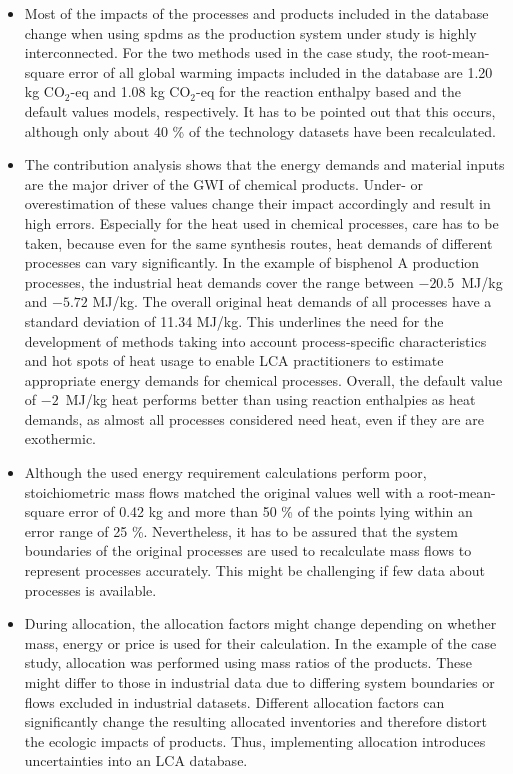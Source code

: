\begin{itemize}

    \item Most of the impacts of the processes and products included in the database change when using \aclp{spdm} as the production system under study is highly interconnected. For the two methods used in the case study, the root-mean-square error of all global warming impacts included in the database are 1.20 kg CO$_2$-eq and 1.08 kg CO$_2$-eq for the reaction enthalpy based and the default values models, respectively. It has to be pointed out that this occurs, although only about 40 \% of the technology datasets have been recalculated. 
    \item The contribution analysis shows that the energy demands and material inputs are the major driver of the \acl{GWI} of chemical products. Under- or overestimation of these values change their impact accordingly and result in high errors. Especially for the heat used in chemical processes, care has to be taken, because even for the same synthesis routes, heat demands of different processes can vary significantly. In the example of bisphenol A production processes, the industrial heat demands cover the range between $-20.5$~MJ/kg and $-5.72$ MJ/kg. The overall original heat demands of all processes have a standard deviation of 11.34 MJ/kg. This underlines the need for the development of methods taking into account process-specific characteristics and hot spots of heat usage to enable LCA practitioners to estimate appropriate energy demands for chemical processes. Overall, the default value of $-2$~MJ/kg heat performs better than using reaction enthalpies as heat demands, as almost all processes considered need heat, even if they are are exothermic.
    \item Although the used energy requirement calculations perform poor, stoichiometric mass flows matched the original values well with a root-mean-square error of 0.42 kg and more than 50 \% of the points lying within an error range of 25 \%. Nevertheless, it has to be assured that the system boundaries of the original processes are used to recalculate mass flows to represent processes accurately. This might be challenging if few data about processes is available. 
    \item  During allocation, the allocation factors might change depending on whether mass, energy or price is used for their calculation. In the example of the case study, allocation was performed using mass ratios of the products. These might differ to those in industrial data due to differing system boundaries or flows excluded in industrial datasets. Different allocation factors can significantly change the resulting allocated inventories and therefore distort the ecologic impacts of products. Thus, implementing allocation introduces uncertainties into an LCA database.

\end{itemize}
